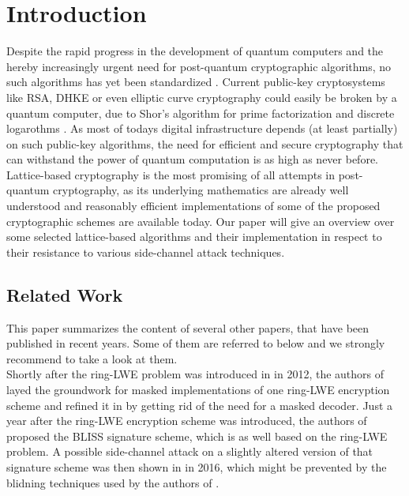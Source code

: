%
%

\chapter{Introduction}
Despite the rapid progress in the development of quantum computers and the hereby increasingly urgent need for post-quantum cryptographic algorithms, no such algorithms has yet been standardized \cite{Nist}. Current public-key cryptosystems like RSA, DHKE or even elliptic curve cryptography could easily be broken by a quantum computer, due to Shor's algorithm for prime factorization and discrete logarothms \cite{Shor}. As most of todays digital infrastructure depends (at least partially) on such public-key algorithms, the need for efficient and secure cryptography that can withstand the power of quantum computation is as high as never before.\\
Lattice-based cryptography is the most promising of all attempts in post-quantum cryptography, as its underlying mathematics are already well understood and reasonably efficient implementations of some of the proposed cryptographic schemes are available today. Our paper will give an overview over some selected lattice-based algorithms and their implementation in respect to their resistance to various side-channel attack techniques.\\

\section{Related Work}
This paper summarizes the content of several other papers, that have been published in recent years. Some of them are referred to below and we strongly recommend to take a look at them.\\
Shortly after the \acs{ring-LWE} problem was introduced in \cite{cryptoeprint:2012:230} in 2012, the authors of \cite{maskedRing} layed the groundwork for masked implementations of one \acs{ring-LWE} encryption scheme and refined it in \cite{Reparaz2016} by getting rid of the need for a masked decoder. Just a year after the \acs{ring-LWE} encryption scheme was introduced, the authors of \cite{bliss} proposed the BLISS signature scheme, which is as well based on the \acs{ring-LWE} problem. A possible side-channel attack on a slightly altered version of that signature scheme was then shown in \cite{cryptoeprint:2016:300} in 2016, which might be prevented by the blidning techniques used by the authors of \cite{cryptoeprint:2016:276}.


